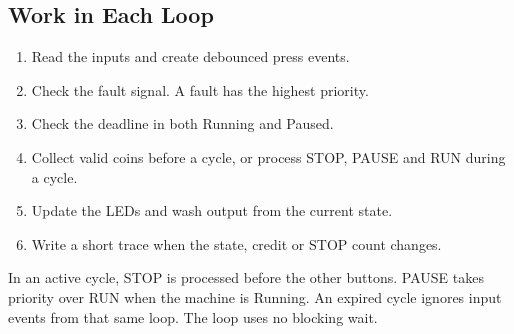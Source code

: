 \subsection{Work in Each Loop}
\begin{enumerate}
\item Read the inputs and create debounced press events.
\item Check the fault signal. A fault has the highest priority.
\item Check the deadline in both Running and Paused.
\item Collect valid coins before a cycle, or process STOP, PAUSE and RUN during a cycle.
\item Update the LEDs and wash output from the current state.
\item Write a short trace when the state, credit or STOP count changes.
\end{enumerate}
In an active cycle, STOP is processed before the other buttons. PAUSE takes
priority over RUN when the machine is Running. An expired cycle ignores input
events from that same loop. The loop uses no blocking wait.
